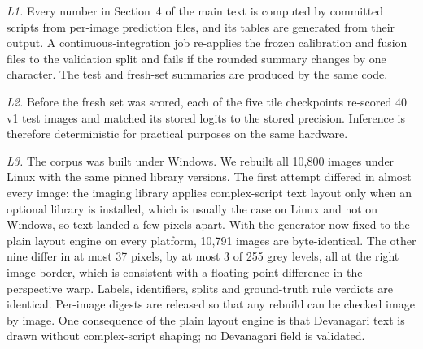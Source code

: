 \documentclass[12pt]{article}
\begin{document}
\emph{L1.} Every number in Section~4 of the main text is computed by
committed scripts from per-image prediction files, and its tables are
generated from their output. A continuous-integration job
re-applies the frozen calibration and fusion files to the validation
split and fails if the rounded summary changes by one character. The
test and fresh-set summaries are produced by the same code.

\emph{L2.} Before the fresh set was scored, each of the five tile
checkpoints re-scored 40 v1 test images and matched its stored logits
to the stored precision. Inference is therefore deterministic for
practical purposes on the same hardware.

\emph{L3.} The corpus was built under Windows. We rebuilt all 10,800
images under Linux with the same pinned library versions. The first
attempt differed in almost every image: the imaging library applies
complex-script text layout only when an optional library is installed,
which is usually the case on Linux and not on Windows, so text landed a
few pixels apart. With the generator now fixed to the plain layout
engine on every platform, 10,791 images are byte-identical. The other
nine differ in at most 37 pixels, by at most 3 of 255 grey levels, all
at the right image border, which is consistent with a floating-point
difference in the perspective warp. Labels, identifiers, splits and
ground-truth rule verdicts are identical. Per-image digests are
released so that any rebuild can be checked image by image. One
consequence of the plain layout engine is that Devanagari text is drawn
without complex-script shaping; no Devanagari field is validated.
\end{document}

